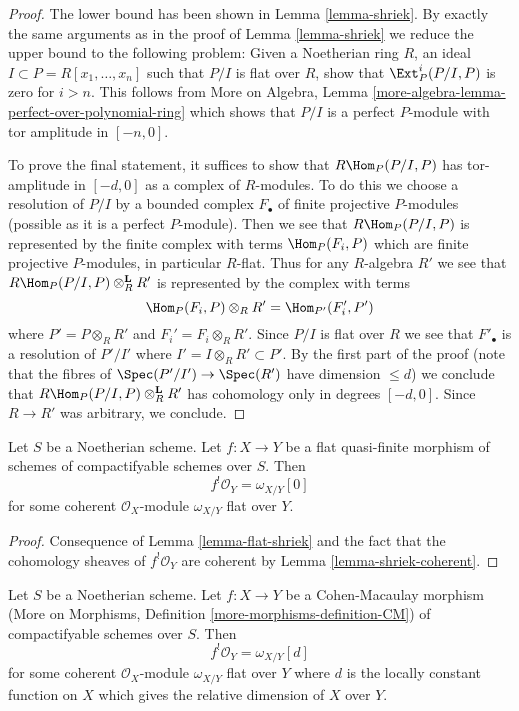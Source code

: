 \begin{proof}
The lower bound has been shown in Lemma \ref{lemma-shriek}.
By exactly the same arguments as in the proof of
Lemma \ref{lemma-shriek} we reduce the upper bound to the
following problem: Given a Noetherian ring $R$, an
ideal $I \subset P = R[x_1, \ldots, x_n]$ such that $P/I$
is flat over $R$, show that $\Ext^i_P(P/I, P)$ is
zero for $i > n$. This follows from
More on Algebra, Lemma \ref{more-algebra-lemma-perfect-over-polynomial-ring}
which shows that $P/I$ is a perfect $P$-module with
tor amplitude in $[-n, 0]$.

\medskip\noindent
To prove the final statement, it suffices to show that
$R\Hom_P(P/I, P)$ has tor-amplitude in $[-d, 0]$ as a complex
of $R$-modules. To do this we choose a resolution of $P/I$ by
a bounded complex $F_\bullet$ of finite projective $P$-modules (possible as
it is a perfect $P$-module). Then we see that $R\Hom_P(P/I, P)$ is represented
by the finite complex with terms $\Hom_P(F_i, P)$ which are finite
projective $P$-modules, in particular $R$-flat. Thus for any $R$-algebra
$R'$ we see that $R\Hom_P(P/I, P) \otimes_R^\mathbf{L} R'$
is represented by the complex with terms
$$
\Hom_P(F_i, P) \otimes_R R' = \Hom_{P'}(F_i', P')
$$
where $P' = P \otimes_R R'$ and $F_i' = F_i \otimes_R R'$. Since
$P/I$ is flat over $R$ we see that $F'_\bullet$ is a resolution
of $P'/I'$ where $I' = I \otimes_R R' \subset P'$. By the
first part of the proof (note that the fibres of $\Spec(P'/I') \to \Spec(R')$
have dimension $\leq d$) we conclude that
$R\Hom_P(P/I, P) \otimes_R^\mathbf{L} R'$
has cohomology only in degrees $[-d, 0]$. Since $R \to R'$
was arbitrary, we conclude.
\end{proof}

\begin{lemma}
\label{lemma-flat-quasi-finite-shriek}
Let $S$ be a Noetherian scheme. Let $f : X \to Y$ be a flat quasi-finite
morphism of schemes of compactifyable schemes over $S$. Then
$$
f^!\mathcal{O}_Y = \omega_{X/Y}[0]
$$
for some coherent $\mathcal{O}_X$-module $\omega_{X/Y}$ flat over $Y$.
\end{lemma}

\begin{proof}
Consequence of Lemma \ref{lemma-flat-shriek} and the fact that the
cohomology sheaves of $f^!\mathcal{O}_Y$ are coherent by
Lemma \ref{lemma-shriek-coherent}.
\end{proof}

\begin{lemma}
\label{lemma-CM-shriek}
Let $S$ be a Noetherian scheme. Let $f : X \to Y$ be a Cohen-Macaulay
morphism (More on Morphisms, Definition \ref{more-morphisms-definition-CM})
of compactifyable schemes over $S$. Then
$$
f^!\mathcal{O}_Y = \omega_{X/Y}[d]
$$
for some coherent $\mathcal{O}_X$-module $\omega_{X/Y}$ flat over $Y$
where $d$ is the locally constant
function on $X$ which gives the relative dimension of $X$ over $Y$.
\end{lemma}

